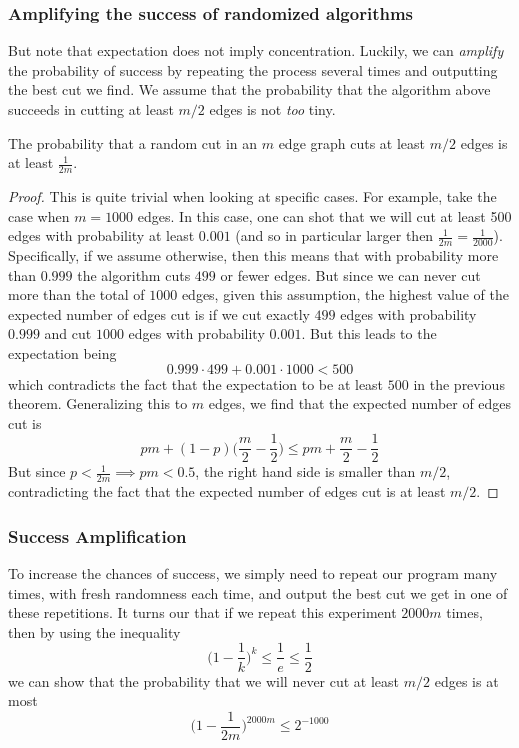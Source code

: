 \documentclass{article}
\begin{document}
  \subsubsection{Amplifying the success of randomized algorithms}
  But note that expectation does not imply concentration. Luckily, we can \textit{amplify} the probability of success by repeating the process several times and outputting the best cut we find. We assume that the probability that the algorithm above succeeds in cutting at least $m/2$ edges is not \textit{too} tiny. 

  \begin{lemma}
  The probability that a random cut in an $m$ edge graph cuts at least $m/2$ edges is at least $\frac{1}{2m}$. 
  \end{lemma}
  \begin{proof}
  This is quite trivial when looking at specific cases. For example, take the case when $m =1000$ edges. In this case, one can shot that we will cut at least 500 edges with probability at least $0.001$ (and so in particular larger then $\frac{1}{2m} = \frac{1}{2000}$). Specifically, if we assume otherwise, then this means that with probability more than $0.999$ the algorithm cuts $499$ or fewer edges. But since we can never cut more than the total of $1000$ edges, given this assumption, the highest value of the expected number of edges cut is if we cut exactly $499$ edges with probability $0.999$ and cut $1000$ edges with probability $0.001$. But this leads to the expectation being
  \[0.999 \cdot 499 + 0.001 \cdot 1000 < 500\]
  which contradicts the fact that the expectation to be at least $500$ in the previous theorem. Generalizing this to $m$ edges, we find that the expected number of edges cut is 
  \[pm + (1-p) \Big( \frac{m}{2} - \frac{1}{2} \Big) \leq pm + \frac{m}{2} - \frac{1}{2}\]
  But since $p < \frac{1}{2m} \implies pm < 0.5$, the right hand side is smaller than $m/2$, contradicting the fact that the expected number of edges cut is at least $m/2$. 
  \end{proof}

  \subsubsection{Success Amplification}
  To increase the chances of success, we simply need to repeat our program many times, with fresh randomness each time, and output the best cut we get in one of these repetitions. It turns our that if we repeat this experiment $2000m$ times, then by using the inequality
  \[\Big( 1 - \frac{1}{k} \Big)^k \leq \frac{1}{e} \leq \frac{1}{2}\]
  we can show that the probability that we will never cut at least $m/2$ edges is at most 
  \[\Big( 1 - \frac{1}{2m} \Big)^{2000m} \leq 2^{-1000}\]
\end{document}
